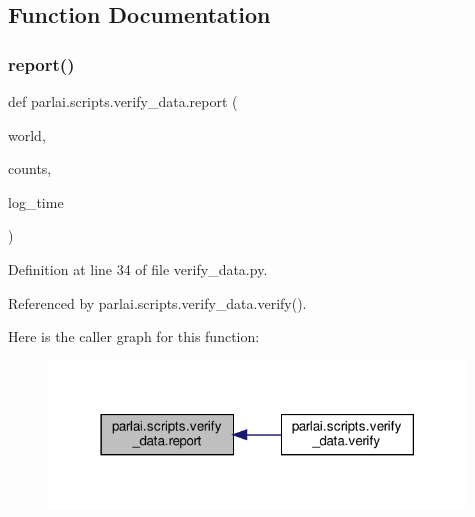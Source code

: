 \subsection{Function Documentation}
\mbox{\label{namespaceparlai_1_1scripts_1_1verify__data_a26153466b8f1f0c901768b4b3c56c885}} 
\subsubsection{\texorpdfstring{report()}{report()}}
{\footnotesize\ttfamily def parlai.\+scripts.\+verify\+\_\+data.\+report (\begin{DoxyParamCaption}\item[{}]{world,  }\item[{}]{counts,  }\item[{}]{log\+\_\+time }\end{DoxyParamCaption})}



Definition at line 34 of file verify\+\_\+data.\+py.



Referenced by parlai.\+scripts.\+verify\+\_\+data.\+verify().

Here is the caller graph for this function\+:
\nopagebreak
\begin{figure}[H]
\begin{center}
\leavevmode
\includegraphics[width=314pt]{namespaceparlai_1_1scripts_1_1verify__data_a26153466b8f1f0c901768b4b3c56c885_icgraph}
\end{center}
\end{figure}
\mbox{\label{namespaceparlai_1_1scripts_1_1verify__data_aecfb15331606adc88ee4221c2945a17d}} 
